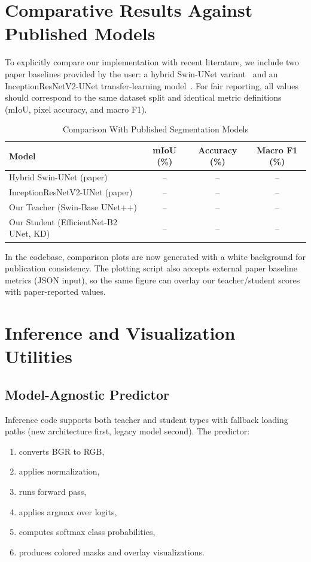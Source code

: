\documentclass[journal]{IEEEtran}
\begin{document}
\section{Comparative Results Against Published Models}
To explicitly compare our implementation with recent literature, we include two paper baselines provided by the user: a hybrid Swin-UNet variant~\cite{sundarr2025hybrid} and an InceptionResNetV2-UNet transfer-learning model~\cite{faska2025inceptionresnet}. For fair reporting, all values should correspond to the same dataset split and identical metric definitions (mIoU, pixel accuracy, and macro F1).

\begin{table}[t]
\caption{Comparison With Published Segmentation Models}
\label{tab:paper_comparison}
\centering
\begin{tabular}{lccc}
\toprule
Model & mIoU (\%) & Accuracy (\%) & Macro F1 (\%) \\
\midrule
Hybrid Swin-UNet (paper)~\cite{sundarr2025hybrid} & -- & -- & -- \\
InceptionResNetV2-UNet (paper)~\cite{faska2025inceptionresnet} & -- & -- & -- \\
\midrule
Our Teacher (Swin-Base UNet++) & -- & -- & -- \\
Our Student (EfficientNet-B2 UNet, KD) & -- & -- & -- \\
\bottomrule
\end{tabular}
\end{table}

In the codebase, comparison plots are now generated with a white background for publication consistency. The plotting script also accepts external paper baseline metrics (JSON input), so the same figure can overlay our teacher/student scores with paper-reported values.

\section{Inference and Visualization Utilities}
\subsection{Model-Agnostic Predictor}
Inference code supports both teacher and student types with fallback loading paths (new architecture first, legacy model second). The predictor:
\begin{enumerate}
    \item converts BGR to RGB,
    \item applies normalization,
    \item runs forward pass,
    \item applies argmax over logits,
    \item computes softmax class probabilities,
    \item produces colored masks and overlay visualizations.
\end{enumerate}
\end{document}
